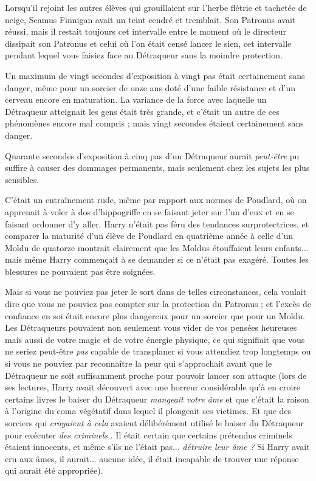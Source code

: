 Lorsqu'il rejoint les autres élèves qui grouillaient sur l'herbe flétrie et tachetée de neige, Seamus Finnigan avait un teint cendré et tremblait. Son Patronus avait réussi, mais il restait toujours cet intervalle entre le moment où le directeur dissipait son Patronus et celui où l'on était censé lancer le sien, cet intervalle pendant lequel vous faisiez face au Détraqueur sans la moindre protection.

Un maximum de vingt secondes d'exposition à vingt pas était certainement sans danger, même pour un sorcier de onze ans doté d'une faible résistance et d'un cerveau encore en maturation. La variance de la force avec laquelle un Détraqueur atteignait les gens était très grande, et c'était un autre de ces phénomènes encore mal compris ; mais vingt secondes étaient certainement sans danger.

Quarante secondes d'exposition à cinq pas d'un Détraqueur aurait \emph{peut-être}  pu suffire à causer des dommages permanents, mais seulement chez les sujets les plus sensibles.

C'était un entraînement rude, même par rapport aux normes de Poudlard, où on apprenait à voler à dos d'hippogriffe en se faisant jeter sur l'un d'eux et en se faisant ordonner d'y aller. Harry n'était pas féru des tendances surprotectrices, et comparer la maturité d'un élève de Poudlard en quatrième année à celle d'un Moldu de quatorze montrait clairement que les Moldus étouffaient leurs enfants... mais même Harry commençait à se demander si ce n'était pas exagéré. Toutes les blessures ne pouvaient pas être soignées.

Mais si vous ne pouviez pas jeter le sort dans de telles circonstances, cela voulait dire que vous ne pouviez pas compter sur la protection du Patronus ; et l'excès de confiance en soi était encore plus dangereux pour un sorcier que pour un Moldu. Les Détraqueurs pouvaient non seulement vous vider de vos pensées heureuses mais aussi de votre magie et de votre énergie physique, ce qui signifiait que vous ne seriez peut-être \emph{pas}  capable de transplaner si vous attendiez trop longtemps ou si vous ne pouviez par reconnaître la peur qui s'approchait avant que le Détraqueur ne soit suffisamment proche pour pouvoir lancer son attaque (lors de ses lectures, Harry avait découvert avec une horreur considérable qu'à en croire certains livres le baiser du Détraqueur \emph{mangeait votre âme}  et que c'était la raison à l'origine du coma végétatif dans lequel il plongeait ses victimes. Et que des sorciers qui \emph{croyaient à cela}  avaient délibérément utilisé le baiser du Détraqueur pour exécuter\emph{ des criminels} . Il était certain que certains prétendus criminels étaient innocents, et même s'ils ne l'était pas... \emph{détruire leur âme ?}  Si Harry avait cru aux âmes, il aurait... aucune idée, il était incapable de trouver une réponse qui aurait été appropriée).

